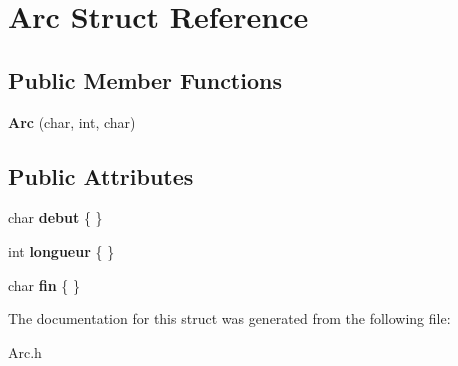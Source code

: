 \hypertarget{structArc}{}\section{Arc Struct Reference}
\label{structArc}
\subsection*{Public Member Functions}
\begin{DoxyCompactItemize}
\item 
{\bfseries Arc} (char, int, char)\hypertarget{structArc_ab93da20887feebc1f2e0ccab891921f9}{}\label{structArc_ab93da20887feebc1f2e0ccab891921f9}

\end{DoxyCompactItemize}
\subsection*{Public Attributes}
\begin{DoxyCompactItemize}
\item 
char {\bfseries debut} \{ \}\hypertarget{structArc_a733df436e777e26c82a0b5ea0e5b5069}{}\label{structArc_a733df436e777e26c82a0b5ea0e5b5069}

\item 
int {\bfseries longueur} \{ \}\hypertarget{structArc_a154594689c2d2d5838ad44e4e121ea8e}{}\label{structArc_a154594689c2d2d5838ad44e4e121ea8e}

\item 
char {\bfseries fin} \{ \}\hypertarget{structArc_a761a5a4813830b8383aefe9b2b27ca37}{}\label{structArc_a761a5a4813830b8383aefe9b2b27ca37}

\end{DoxyCompactItemize}


The documentation for this struct was generated from the following file\+:\begin{DoxyCompactItemize}
\item 
Arc.\+h\end{DoxyCompactItemize}
